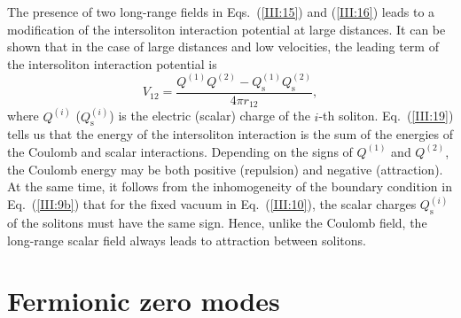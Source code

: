 The presence of two long-range fields in Eqs.~(\ref{III:15}) and (\ref{III:16})
leads to a modification  of  the  intersoliton  interaction  potential at large
distances.
It can be shown that in the case  of  large  distances  and low velocities, the
leading term of the intersoliton interaction potential is
\begin{equation}
V_{12}=\frac{Q^{\left( 1\right) }Q^{\left( 2\right) }-Q_{\text{s}}^{\left(
1\right) }Q_{\text{s}}^{\left( 2\right) }}{4\pi r_{12}},         \label{III:19}
\end{equation}
where $Q^{\left( i \right)}$ ($Q_{\text{s}}^{\left( i\right)}$) is the electric
(scalar) charge of the $i$-th soliton.
Eq.~(\ref{III:19}) tells us that the energy  of the intersoliton interaction is
the sum of the energies of the Coulomb and scalar interactions.
Depending on  the  signs  of $Q^{(1)}$ and $Q^{(2)}$, the Coulomb energy may be
both positive (repulsion) and negative (attraction).
At the same time, it follows from the inhomogeneity  of the  boundary condition
in Eq.~(\ref{III:9b}) that  for  the  fixed  vacuum  in Eq.~(\ref{III:10}), the
scalar charges $Q_{\text{s}}^{\left( i \right) }$  of  the  solitons  must have
the same sign.
Hence, unlike the  Coulomb  field,  the long-range scalar field always leads to
attraction between solitons.

\section{Fermionic zero modes}
\label{seq:IV}

